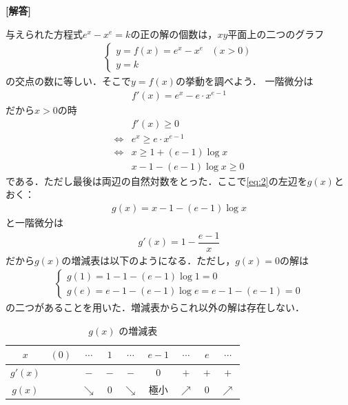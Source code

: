 \documentclass[../../main.tex]{subfiles}
\begin{document}
\begin{oframed}
  
\end{oframed}

{\bf [解答]}

与えられた方程式$e^{x}-x^{e}=k$の正の解の個数は，$xy$平面上の二つのグラフ
\begin{align}
  \begin{cases}
    y = f(x) = e^x-x^e & (x>0) \\
    y = k
  \end{cases} \label{eq:1}
\end{align}
の交点の数に等しい．そこで$y=f(x)$の挙動を調べよう．
一階微分は
\begin{align}
  f'(x)=e^x-e\cdot x^{e-1}
\end{align}
だから$x>0$の時
\begin{align}
  &f'(x)\ge 0 \\
  \iff
  &e^x\ge e\cdot x^{e-1} \\
  \iff
  &x\ge 1+(e-1)\log x \\
  &x-1-(e-1)\log x \ge 0 \label{eq:2}
\end{align}
である．ただし最後は両辺の自然対数をとった．ここで\cref{eq:2}の左辺を$g(x)$とおく：
\begin{align}
  g(x)=x-1-(e-1)\log x
\end{align}
と一階微分は
\begin{align}
  g'(x)=1-\dfrac{e-1}{x}
\end{align}
だから$g(x)$の増減表は以下のようになる．ただし，$g(x)=0$の解は
\begin{align}
  \begin{cases}
    g(1)=1-1-(e-1)\log1=0 \\
    g(e)=e-1-(e-1)\log e=e-1-(e-1)=0
  \end{cases}
\end{align}
の二つがあることを用いた．増減表からこれ以外の解は存在しない．

\begin{table}[htb]
  \centering
  \caption{$g(x)$ の増減表}
  \begin{tabular}{c|cccccccc}
    $x$ & $(0)$ & $\cdots$ & $1$ & $\cdots$ & $e-1$ & $\cdots$ & $e$ & $\cdots$ \\
    \hline
    $g'(x)$ & & $-$ & $-$ & $-$ & $0$ & $+$ & $+$ & $+$ \\
    \hline
    $g(x)$ & & $\searrow$ & $0$ & $\searrow$ & 極小 & $\nearrow$ & $0$ & $\nearrow$
  \end{tabular}
\end{table}
\end{document}
